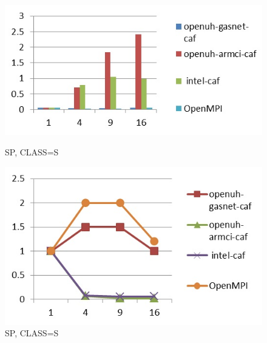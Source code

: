 \begin{figure}[ht]
\begin{minipage}[b]{0.45\linewidth}
\centering
\includegraphics[width=\textwidth]{./figures/sp_S_time.jpg}
\caption{SP, CLASS=S}
\label{fig:figure1}
\end{minipage}
\hspace{0.5cm}
\begin{minipage}[b]{0.45\linewidth}
\centering
\includegraphics[width=\textwidth]{./figures/sp_S_scalability.jpg}
\caption{SP, CLASS=S}
\label{fig:figure2}
\end{minipage}
\end{figure}


